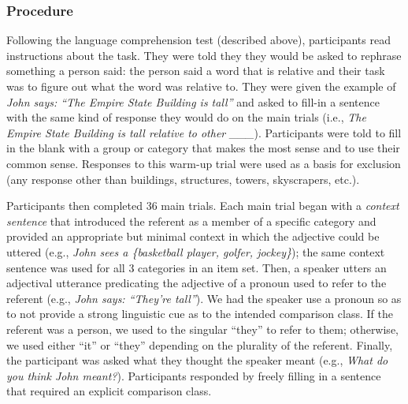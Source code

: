 \documentclass[doc]{apa6}
\begin{document}
\subsubsection{Procedure}

Following the language comprehension test (described above), participants read instructions about the task. They were told they they would be asked to rephrase something a person said:  the person said a word that is relative and their task was to figure out what the word was relative to. They were given the example of \emph{John says: ``The Empire State Building is tall''} and asked to fill-in a sentence with the same kind of response they would do on the main trials (i.e., \emph{The Empire State Building is tall relative to other \_\_\_}). Participants were told to fill in the blank with a group or category that makes the most sense and to use their common sense.
Responses to this warm-up trial were used as a basis for exclusion (any response other than buildings, structures, towers, skyscrapers, etc.). 


Participants then completed 36 main trials. Each main trial began with a \emph{context sentence} that introduced the referent as a member of a specific category and provided an appropriate but minimal context in which the adjective could be uttered (e.g., \emph{John sees a \{basketball player, golfer, jockey\}}); the same context sentence was used for all 3 categories in an item set.
Then, a speaker utters an adjectival utterance predicating the adjective of a pronoun used to refer to the referent (e.g., \emph{John says: ``They're tall''}). 
We had the speaker use a pronoun so as to not provide a strong linguistic cue as to the intended comparison class. If the referent was a person, we used to the singular ``they'' to refer to them; otherwise, we used either ``it'' or ``they'' depending on the plurality of the referent. 
Finally, the participant was asked what they thought the speaker meant (e.g., \emph{What do you think John meant?}). Participants responded by freely filling in a sentence that required an explicit comparison class. 
\end{document}
